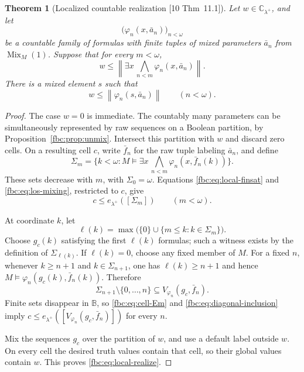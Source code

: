 \documentclass[11pt,letterpaper]{article}
\newtheorem{theorem}{Theorem}[section]
\theoremstyle{definition}
\theoremstyle{remark}
\newcommand{\om}{\omega}
\newcommand{\B}{\mathbb B}
\newcommand{\C}{\mathbb C}
\newcommand{\Mix}{\operatorname{Mix}}
\newcommand{\truth}[1]{\left\lVert #1\right\rVert}
\newcommand{\src}[1]{\textup{[#1]}}
\begin{document}
\begin{theorem}[Localized countable realization \src{10 Thm~11.1}]
\label{fbc:thm:localized}
Let $w\in\C_{\lambda^+}$, and let
\[
 \bigl(\varphi_n(x,\bar a_n)\bigr)_{n<\om}
\]
be a countable family of formulas with finite tuples of mixed parameters
$\bar a_n$ from $\Mix_M(1)$. Suppose that for every $m<\om$,
\begin{equation}\label{fbc:eq:local-finsat}
 w\leq\truth{\exists x\,\bigwedge_{n<m}\varphi_n(x,\bar a_n)}.
\end{equation}
There is a mixed element $s$ such that
\begin{equation}\label{fbc:eq:local-realize}
 w\leq\truth{\varphi_n(s,\bar a_n)}\qquad(n<\om).
\end{equation}
\end{theorem}
\begin{proof}
The case $w=0$ is immediate. The countably many parameters can be
simultaneously represented by raw sequences on a Boolean partition,
by Proposition~\ref{fbc:prop:unmix}. Intersect this partition with $w$ and
discard zero cells. On a resulting cell $c$, write $\bar f_n$ for the
raw tuple labeling $\bar a_n$, and define
\[
 \Sigma_m=\{k<\om:M\models
                 \exists x\,\bigwedge_{n<m}\varphi_n(x,\bar f_n(k))\}.
\]
These sets decrease with $m$, with $\Sigma_0=\om$. Equations
\eqref{fbc:eq:local-finsat} and \eqref{fbc:eq:los-mixing}, restricted to
$c$, give
\begin{equation}\label{fbc:eq:cell-Em}
 c\leq e_{\lambda^+}([\Sigma_m])\qquad(m<\om).
\end{equation}

At coordinate $k$, let
\[
 \ell(k)=\max\bigl(\{0\}\cup\{m\leq k:k\in\Sigma_m\}\bigr).
\]
Choose $g_c(k)$ satisfying the first $\ell(k)$ formulas; such a
witness exists by the definition of $\Sigma_{\ell(k)}$. If $\ell(k)=0$,
choose any fixed member of $M$. For a fixed $n$, whenever
$k\geq n+1$ and $k\in\Sigma_{n+1}$, one has $\ell(k)\geq n+1$ and
hence $M\models\varphi_n(g_c(k),\bar f_n(k))$. Therefore
\begin{equation}\label{fbc:eq:diagonal-inclusion}
 \Sigma_{n+1}\setminus\{0,\ldots,n\}
       \subseteq V_{\varphi_n}(g_c,\bar f_n).
\end{equation}
Finite sets disappear in $\B$, so \eqref{fbc:eq:cell-Em} and
\eqref{fbc:eq:diagonal-inclusion} imply
$c\leq e_{\lambda^+}([V_{\varphi_n}(g_c,\bar f_n)])$ for every $n$.

Mix the sequences $g_c$ over the partition of $w$, and use a default
label outside $w$. On every cell the desired truth values contain that
cell, so their global values contain $w$. This proves
\eqref{fbc:eq:local-realize}.
\end{proof}
\end{document}
